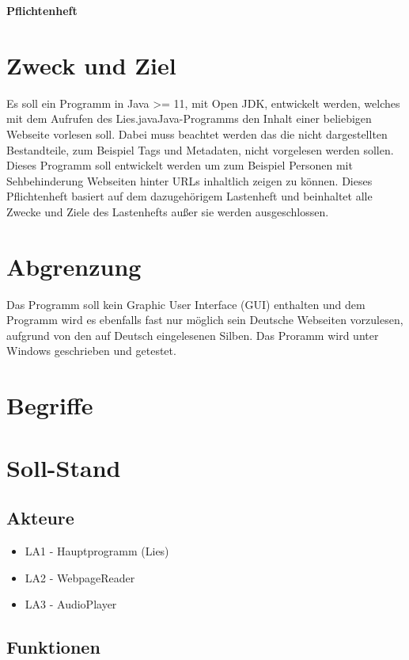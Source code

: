 \documentclass[11pt]{scrartcl}
\begin{document}
\begin{center}
\textbf{Pflichtenheft}
\end{center}

\section{Zweck und Ziel}
Es soll ein Programm in Java >= 11, mit Open JDK, entwickelt werden, welches mit dem Aufrufen des \glqq Lies.java\grqq Java-Programms den Inhalt einer beliebigen Webseite vorlesen soll. Dabei muss beachtet werden das die nicht dargestellten Bestandteile, zum Beispiel Tags und Metadaten, nicht vorgelesen werden sollen. Dieses Programm soll entwickelt werden um zum Beispiel Personen mit Sehbehinderung Webseiten hinter URLs inhaltlich zeigen zu können. Dieses Pflichtenheft basiert auf dem dazugehörigem Lastenheft und beinhaltet alle Zwecke und Ziele des Lastenhefts außer sie werden ausgeschlossen.

\section{Abgrenzung}
Das Programm soll kein Graphic User Interface (GUI) enthalten und dem Programm wird es ebenfalls fast nur möglich sein Deutsche Webseiten vorzulesen, aufgrund von den auf Deutsch eingelesenen Silben. Das Proramm wird unter Windows geschrieben und getestet.

\section{Begriffe}


\section{Soll-Stand}


\subsection{Akteure}

\begin{itemize}
	\item LA1 - Hauptprogramm (Lies)
	\item LA2 - WebpageReader
	\item LA3 - AudioPlayer
\end{itemize}

\subsection{Funktionen}
\end{document}
